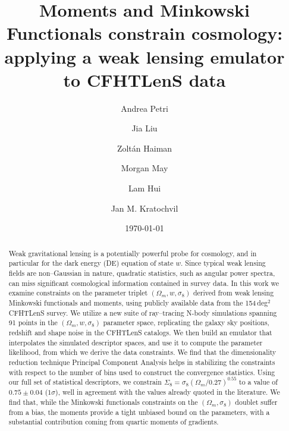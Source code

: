 \documentclass[reprint,aps,prd,superscriptaddress,showkeys,showpacs]{revtex4-1}
\begin{document}
\title{Moments and Minkowski Functionals constrain cosmology: applying a weak lensing emulator to CFHTLenS data}

\author{Andrea Petri}

\author{Jia Liu}

\author{Zolt\'an Haiman}

\author{Morgan May}

\author{Lam Hui}

\author{Jan M. Kratochvil}

\date{\today}

\label{firstpage}


\begin{abstract}
Weak gravitational lensing is a potentially powerful probe for cosmology, and in particular for the dark energy (DE) equation of state $w$. Since typical weak lensing fields are non--Gaussian in nature, quadratic statistics, such as angular power spectra, can miss significant cosmological information contained in survey data. In this work we examine constraints on the parameter triplet $(\Omega_m,w,\sigma_8)$ derived from weak lensing Minkowski functionals and moments, using publicly available data from the 154\,deg$^2$ CFHTLenS survey. We utilize a new suite of ray--tracing N-body simulations spanning 91 points in the $(\Omega_m,w,\sigma_8)$ parameter space, replicating the galaxy sky positions, redshift and shape noise in the CFHTLenS catalogs. We then build an emulator that interpolates the simulated descriptor spaces, and use it to compute the parameter likelihood, from which we derive the data constraints. We find that the dimensionality reduction technique Principal Component Analysis helps in stabilizing the constraints with respect to the number of bins used to construct the convergence statistics. Using our full set of statistical descriptors, we constrain $\Sigma_8=\sigma_8(\Omega_m/0.27)^{0.55}$ to a value of $0.75\pm0.04$ ($1\sigma$), well in agreement with the values already quoted in the literature. We find that, while the Minkowski functionals constraints on the $(\Omega_m,\sigma_8)$ doublet suffer from a bias, the moments provide a tight unbiased bound on the parameters, with a substantial contribution coming from quartic moments of gradients.  

\end{abstract}
\end{document}
